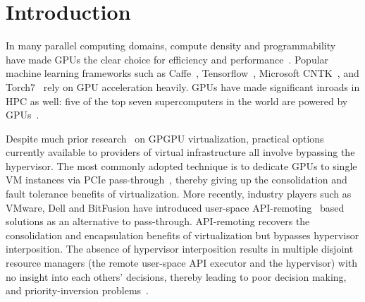 
\section{Introduction}

In many parallel computing domains, compute density and
programmability~\cite{nvidia_cuda, stone2010opencl, gregory2014c++} have
made GPUs the clear choice for efficiency and performance~\cite{gpu_apps}.
Popular machine learning frameworks such as Caffe~\cite{jia2014caffe},
Tensorflow~\cite{abadi2016tensorflow}, Microsoft
CNTK~\cite{yu2014introduction}, and Torch7~\cite{collobert2011torch7}
rely on GPU acceleration heavily. GPUs have made significant inroads in HPC as well:
five of the top seven supercomputers in the world are powered by GPUs~\cite{top500-Nov2018}.

Despite much prior research~\cite{rossbach16vee, kaveri16vee, cc-numa-gpu-hpca15, abhishek-ispass16}
on GPGPU virtualization, practical options currently available to providers of
virtual infrastructure all involve bypassing the hypervisor.
The most commonly adopted technique is to dedicate GPUs to single VM instances via
PCIe pass-through~\cite{AWS-gpu,gVirt},
thereby giving up the consolidation and fault tolerance benefits of virtualization.
More recently, industry players such as VMware, Dell and BitFusion have introduced
user-space API-remoting~\cite{bitfusion-whitepaper,kim2012snucl,rCUDAnew,
vmCUDA,rCUDA} based solutions as an alternative to pass-through.
API-remoting recovers the consolidation and encapsulation benefits
of virtualization but bypasses hypervisor interposition.
The absence of hypervisor interposition results in multiple disjoint resource managers
(the remote user-space API executor and the hypervisor) with no insight into
each others' decisions, thereby leading to poor decision making,
and priority-inversion problems~\cite{rossbach2011ptask}.


